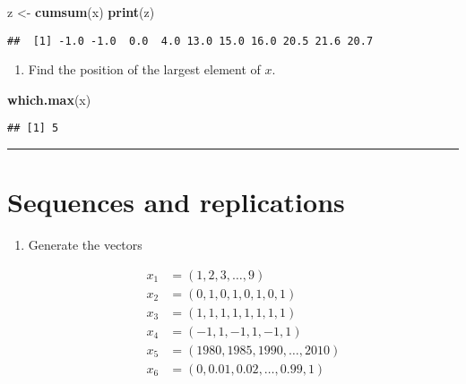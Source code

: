 \documentclass[]{article}
\newenvironment{Shaded}{\begin{snugshade}}{\end{snugshade}}
\newcommand{\KeywordTok}[1]{\textcolor[rgb]{0.13,0.29,0.53}{\textbf{#1}}}
\newcommand{\StringTok}[1]{\textcolor[rgb]{0.31,0.60,0.02}{#1}}
\newcommand{\NormalTok}[1]{#1}
\providecommand{\tightlist}{%
  \setlength{\itemsep}{0pt}\setlength{\parskip}{0pt}}
\begin{document}
\begin{Shaded}
\begin{Highlighting}[]
\NormalTok{z <-}\StringTok{ }\KeywordTok{cumsum}\NormalTok{(x)}
\KeywordTok{print}\NormalTok{(z)}
\end{Highlighting}
\end{Shaded}

\begin{verbatim}
##  [1] -1.0 -1.0  0.0  4.0 13.0 15.0 16.0 20.5 21.6 20.7
\end{verbatim}

\begin{enumerate}
\def\labelenumi{\arabic{enumi}.}
\setcounter{enumi}{4}
\tightlist
\item
  Find the position of the largest element of \(x\).
\end{enumerate}

\begin{Shaded}
\begin{Highlighting}[]
\KeywordTok{which.max}\NormalTok{(x) }
\end{Highlighting}
\end{Shaded}

\begin{verbatim}
## [1] 5
\end{verbatim}

\begin{center}\rule{0.5\linewidth}{\linethickness}\end{center}

\section{Sequences and replications}\label{sequences-and-replications}

\begin{enumerate}
\def\labelenumi{\arabic{enumi}.}
\tightlist
\item
  Generate the vectors

  \begin{align*}
  x_{1} &=\left( 1,2,3,\ldots ,9\right) \\
  x_{2} &=\left( 0,1,0,1,0,1,0,1\right) \\
  x_{3} &=\left( 1,1,1,1,1,1,1,1\right) \\
  x_{4} &=\left( -1,1,-1,1,-1,1\right) \\
  x_{5} &=\left( 1980,1985,1990,\ldots ,2010\right) \\
  x_{6} &=\left( 0,0.01,0.02,\ldots ,0.99,1\right)
  \end{align*}
\end{enumerate}
\end{document}
